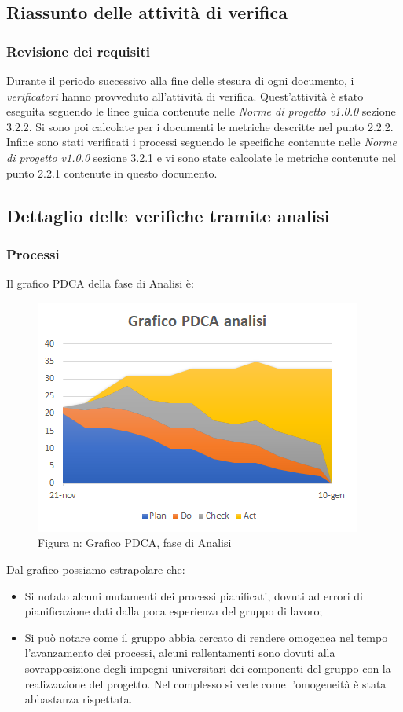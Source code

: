 \subsection{Riassunto delle attività di verifica}
\subsubsection{Revisione dei requisiti}
Durante il periodo successivo alla fine delle stesura di ogni documento, i \emph{verificatori}  hanno provveduto all'attività di verifica. Quest'attività è stato eseguita seguendo le linee guida contenute nelle \emph{Norme di progetto v1.0.0} sezione 3.2.2.
Si sono poi calcolate per i documenti le metriche descritte nel punto 2.2.2.
Infine sono stati verificati i processi seguendo le specifiche contenute nelle \emph{Norme di progetto v1.0.0} sezione 3.2.1 e vi sono state calcolate le metriche contenute nel punto 2.2.1 contenute in questo documento.
\subsection{Dettaglio delle verifiche tramite analisi}
\subsubsection{Processi}
Il grafico PDCA della fase di Analisi è:
\begin{figure} [H]
	\centering
	\includegraphics[scale=1]{Img/Grafico_PDCA}
	\caption{Figura n: Grafico PDCA, fase di Analisi}\label{}
\end{figure}
Dal grafico possiamo estrapolare che:
\begin{itemize}
	\item Si notato alcuni mutamenti dei processi pianificati, dovuti ad errori di pianificazione dati dalla poca esperienza del gruppo di lavoro;
	\item Si può notare come il gruppo abbia cercato di rendere omogenea nel tempo l'avanzamento dei processi, alcuni rallentamenti sono dovuti alla sovrapposizione degli impegni
	universitari dei componenti del gruppo con la realizzazione del progetto. Nel complesso si vede come l'omogeneità è stata abbastanza rispettata.
\end{itemize}

